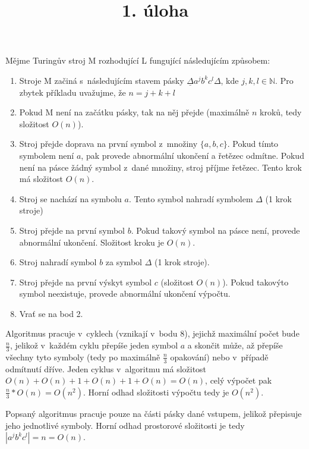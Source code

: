 \documentclass[a4paper]{article}
\title {1. úloha}
\begin{document}
\section*{}
Mějme Turingův stroj M rozhodující L fungující následujícím způsobem:
\begin{enumerate}
    \item Stroje M začiná s~následujícím stavem pásky $\underline{\Delta} a^j b^k c^l\Delta$, kde $j,k,l \in \mathbb{N}$.
    Pro zbytek příkladu uvažujme, že $n=j+k+l$
    \item Pokud M není na začátku pásky, tak na něj přejde (maximálně $n$ kroků, tedy složitost $O(n)$).
    \item Stroj přejde doprava na první symbol z~množiny $\{a,b,c\}$.
    Pokud tímto symbolem není $a$, pak provede abnormální ukončení a řetězec odmítne.
    Pokud není na pásce žádný symbol z~dané množiny, stroj příjme řetězec.
    Tento krok má složitost $O(n)$.
    \item Stroj se nachází na symbolu $a$. Tento symbol nahradí symbolem $\Delta$ (1 krok stroje)
    \item Stroj přejde na první symbol $b$.
    Pokud takový symbol na pásce není, provede abnormální ukončení.
    Složitost kroku je $O(n)$.
    \item Stroj nahradí symbol $b$ za symbol $\Delta$ (1 krok stroje).
    \item Stroj přejde na první výskyt symbol $c$ (složitost $O(n)$).
    Pokud takovýto symbol neexistuje, provede abnormální ukončení výpočtu.
    \item Vrať se na bod 2.
\end{enumerate}
Algoritmus pracuje v~cyklech (vznikají v~bodu 8),
jejichž maximální počet bude $\frac{n}{3}$, jelikož v~každém cyklu přepíše jeden symbol $a$ a skončit může, až přepíše
všechny tyto symboly (tedy po maximálně $\frac{n}{3}$ opakování) nebo v~případě odmítnutí dříve.
Jeden cyklus v~algoritmu má složitost $O(n)+O(n)+1+O(n)+1+O(n)=O(n)$, celý výpočet pak
$\frac{n}{3}*O(n)=O(n^2)$. Horní odhad složitosti výpočtu tedy je $O(n^2)$.

Popsaný algoritmus pracuje pouze na části pásky dané vstupem, jelikož přepisuje jeho jednotlivé symboly.
Horní odhad prostorové složitosti je tedy $|a^j b^k c^l|=n=O(n)$. 
\end{document}
